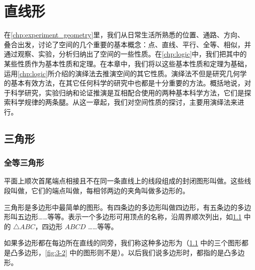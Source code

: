 \chapter{直线形}

在\cref{chp:experiment_geometry}里，我们从日常生活所熟悉的位置、通路、方向、叠合出发，讨论了空间的几个重要的基本概念：点、直线、平行、全等、相似，并通过观察、实验，分析归纳出了空间的一些性质。在\cref{chp:logic}中，我们把其中的某些性质作为基本性质和定理。在本章中，我们将以这些基本性质和定理为基础，运用\cref{chp:logic}所介绍的演绎法去推演空间的其它性质。演绎法不但是研究几何学的基本有效方法，在其它任何科学的研究中也都是十分重要的方法。概括地说，对于科学研究，实验归纳和论证推演是互相配合使用的两种基本科学方法，它们是探索科学规律的两条腿。从这一章起，我们对空间性质的探讨，主要用演绎法来进行。
\section{三角形}
\subsection{全等三角形}

\begin{Definition}
平面上顺次首尾端点相接且不在同一条直线上的线段组成的封闭图形叫做。这些线段叫做，它们的端点叫做，每相邻两边的夹角叫做多边形的。
\end{Definition}

三角形是多边形中最简单的图形。有四条边的多边形叫做四边形，有五条边的多边形叫五边形……等等。表示一个多边形可用顶点的名称，沿周界顺次列出，如\cref{fig:3-1} 中的 $\triangle ABC$，四边形 $ABCD$ ……等等。

如果多边形都在每边所在直线的同旁，我们称这种多边形为（\cref{fig:3-1} 中的三个图形都是凸多边形，\cref{fig:3-2} 中的图形则不是）。以后我们说多边形时，都指的是凸多边形。
\begin{figure}
    \caption{}\label{fig:3-1}
\end{figure}

